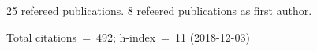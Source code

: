 25 refereed publications. 8 refeered publications as first author.

Total citations~=~492; h-index~=~11 (2018-12-03)